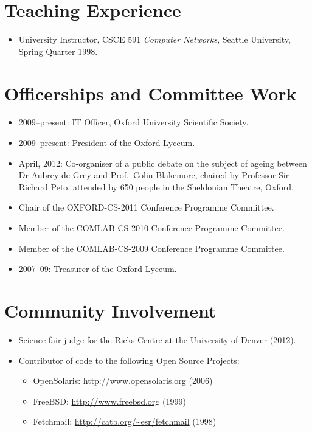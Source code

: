 \documentclass[letterpaper]{article}
\begin{document}
\section*{Teaching Experience} %

\begin{itemize}
    \item University Instructor, CSCE 591 \emph{Computer Networks},
    Seattle University, Spring Quarter 1998.
\end{itemize}

\section*{Officerships and Committee Work}
\begin{itemize}
	\item 2009--present: IT Officer, Oxford University Scientific Society.
	\item 2009--present: President of the Oxford Lyceum.
	\item April, 2012: Co-organiser of a public debate on the subject of ageing between
		Dr Aubrey de Grey and Prof.\ Colin Blakemore, chaired by Professor Sir Richard Peto,
		attended by 650 people in the Sheldonian Theatre, Oxford.
	\item Chair of the OXFORD-CS-2011 Conference Programme Committee.
	\item Member of the COMLAB-CS-2010 Conference Programme Committee.
	\item Member of the COMLAB-CS-2009 Conference Programme Committee.
	\item 2007--09: Treasurer of the Oxford Lyceum.
\end{itemize}

\section*{Community Involvement} %

\begin{itemize}
	\item Science fair judge for the Ricks Centre at the University of Denver (2012).
    \item Contributor of code to the following Open Source Projects:
		\begin{itemize}
			\item OpenSolaris: \url{http://www.opensolaris.org} (2006)
			\item FreeBSD: \url{http://www.freebsd.org} (1999)
			\item Fetchmail: \url{http://catb.org/~esr/fetchmail} (1998)
		\end{itemize}
\end{itemize}
\end{document}
